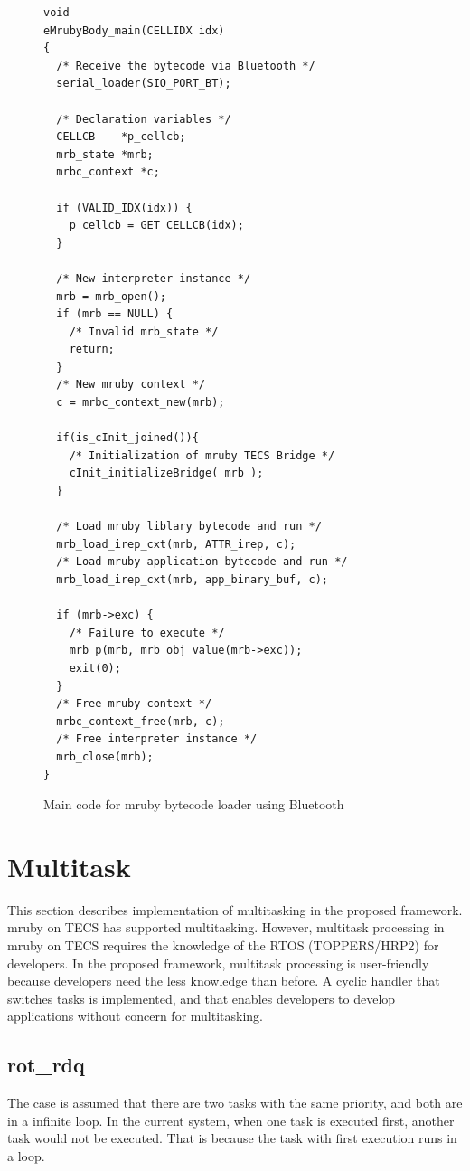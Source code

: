 \documentclass[conference,compsoc]{IEEEtran}
\begin{document}
\begin{figure}[t]
\centering
\begin{lstlisting}
void
eMrubyBody_main(CELLIDX idx)
{
  /* Receive the bytecode via Bluetooth */
  serial_loader(SIO_PORT_BT);

  /* Declaration variables */
  CELLCB	*p_cellcb;
  mrb_state *mrb;
  mrbc_context *c;
      
  if (VALID_IDX(idx)) {
    p_cellcb = GET_CELLCB(idx);
  }

  /* New interpreter instance */
  mrb = mrb_open();
  if (mrb == NULL) {
    /* Invalid mrb_state */
    return;
  }
  /* New mruby context */
  c = mrbc_context_new(mrb);

  if(is_cInit_joined()){
    /* Initialization of mruby TECS Bridge */
    cInit_initializeBridge( mrb );
  }
  
  /* Load mruby liblary bytecode and run */
  mrb_load_irep_cxt(mrb, ATTR_irep, c);
  /* Load mruby application bytecode and run */
  mrb_load_irep_cxt(mrb, app_binary_buf, c);
  
  if (mrb->exc) {
    /* Failure to execute */
    mrb_p(mrb, mrb_obj_value(mrb->exc));
    exit(0);
  }
  /* Free mruby context */ 
  mrbc_context_free(mrb, c);
  /* Free interpreter instance */
  mrb_close(mrb);
}

\end{lstlisting}
\caption{Main code for mruby bytecode loader using Bluetooth}
\label{maincode_mrubybluetooth}
\end{figure}
\section{Multitask}
\label{sec:Multitask}
This section describes implementation of multitasking in the proposed framework.
mruby on TECS has supported multitasking.
However, multitask processing in mruby on TECS requires the knowledge of the RTOS (TOPPERS/HRP2) for developers.
In the proposed framework, multitask processing is user-friendly because developers need the less knowledge than before.
A cyclic handler that switches tasks is implemented, and that enables developers to develop applications without concern for multitasking.

\subsection{rot\_rdq}
The case is assumed that there are two tasks with the same priority, and both are in a infinite loop.
In the current system, when one task is executed first, another task would not be executed.
That is because the task with first execution runs in a loop. 
\end{document}
